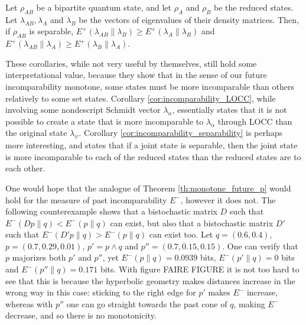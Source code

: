 \begin{corollary} \label{cor:incomparability_separability}
    Let $\rho_{AB}$ be a bipartite quantum state, and let $\rho_A$ and $\rho_B$ be the reduced states. Let $\lambda_{AB}, \lambda_A$ and $\lambda_B$ be the vectors of eigenvalues of their density matrices. Then, if $\rho_{AB}$ is separable, $E^+ (\lambda_{AB} \parallel \lambda_B) \geq E^+ (\lambda_A \parallel \lambda_B)$ and $E^+ (\lambda_{AB} \parallel \lambda_A) \geq E^+ (\lambda_B \parallel \lambda_A)$.
\end{corollary}

These corollaries, while not very useful by themselves, still hold some interpretational value, because they show that in the sense of our future incomparability monotone, some states must be more incomparable than others relatively to some set states. Corollary \ref{cor:incomparability_LOCC}, while involving some nondescript Schmidt vector $\lambda_\alpha$, essentially states that it is not possible to create a state that is more incomparable to $\lambda_\alpha$ through LOCC than the original state $\lambda_\psi$. Corollary \ref{cor:incomparability_separability} is perhaps more interesting, and states that if a joint state is separable, then the joint state is more incomparable to each of the reduced states than the reduced states are to each other. %

One would hope that the analogue of Theorem \ref{th:monotone_future_p} would hold for the measure of past incomparability $E^-$, however it does not. The following counterexample shows that a bistochastic matrix $D$ such that $E^- (Dp \parallel q) < E^- (p \parallel q)$ can exist, but also that a bistochastic matrix $D'$ such that $E^- (D'p \parallel q) > E^- (p \parallel q)$ can exist too. Let $q = (0.6, 0.4)$, $p = (0.7, 0.29, 0.01)$, $p' = p \wedge q$ and $p'' = (0.7, 0.15, 0.15)$. One can verify that $p$ majorizes both $p'$ and $p''$, yet $E^- (p \parallel q) = 0.0939$ bits, $E^- (p' \parallel q) = 0$ bits and $E^- (p'' \parallel q) = 0.171$ bits. With figure FAIRE FIGURE it is not too hard to see that this is because the hyperbolic geometry makes distances increase in the wrong way in this case: sticking to the right edge for $p'$ makes $E^-$ increase, whereas with $p''$ one can go straight towards the past cone of $q$, making $E^-$ decrease, and so there is no monotonicity.



